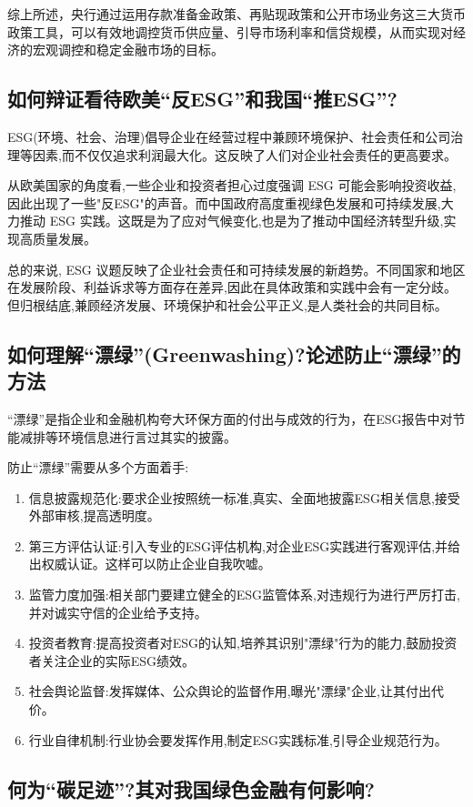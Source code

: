\documentclass{article}
\begin{document}
综上所述，央行通过运用存款准备金政策、再贴现政策和公开市场业务这三大货币政策工具，可以有效地调控货币供应量、引导市场利率和信贷规模，从而实现对经济的宏观调控和稳定金融市场的目标。
   
\subsection{如何辩证看待欧美“反ESG”和我国“推ESG”?}

ESG(环境、社会、治理)倡导企业在经营过程中兼顾环境保护、社会责任和公司治理等因素,而不仅仅追求利润最大化。这反映了人们对企业社会责任的更高要求。

从欧美国家的角度看,一些企业和投资者担心过度强调 ESG 可能会影响投资收益,因此出现了一些"反ESG"的声音。而中国政府高度重视绿色发展和可持续发展,大力推动 ESG 实践。这既是为了应对气候变化,也是为了推动中国经济转型升级,实现高质量发展。

总的来说, ESG 议题反映了企业社会责任和可持续发展的新趋势。不同国家和地区在发展阶段、利益诉求等方面存在差异,因此在具体政策和实践中会有一定分歧。但归根结底,兼顾经济发展、环境保护和社会公平正义,是人类社会的共同目标。

\subsection{如何理解“漂绿”(Greenwashing)?论述防止“漂绿”的方法}

“漂绿”是指企业和金融机构夸大环保方面的付出与成效的行为，在ESG报告中对节能减排等环境信息进行言过其实的披露。

防止“漂绿”需要从多个方面着手:
\begin{enumerate}
	\item 信息披露规范化:要求企业按照统一标准,真实、全面地披露ESG相关信息,接受外部审核,提高透明度。
	\item 第三方评估认证:引入专业的ESG评估机构,对企业ESG实践进行客观评估,并给出权威认证。这样可以防止企业自我吹嘘。
	\item 监管力度加强:相关部门要建立健全的ESG监管体系,对违规行为进行严厉打击,并对诚实守信的企业给予支持。
	\item 投资者教育:提高投资者对ESG的认知,培养其识别"漂绿"行为的能力,鼓励投资者关注企业的实际ESG绩效。
	\item 社会舆论监督:发挥媒体、公众舆论的监督作用,曝光"漂绿"企业,让其付出代价。
	\item 行业自律机制:行业协会要发挥作用,制定ESG实践标准,引导企业规范行为。
\end{enumerate}

\subsection{何为``碳足迹''?其对我国绿色金融有何影响?}
\end{document}
